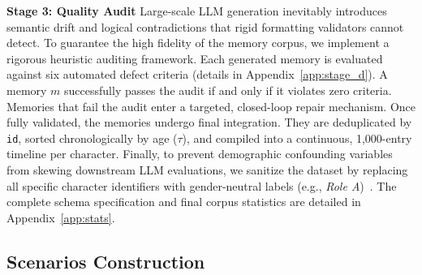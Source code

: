 \documentclass{article}
\begin{document}
\textbf{Stage 3: Quality Audit}
Large-scale LLM generation inevitably introduces semantic drift and logical contradictions that rigid formatting validators cannot detect. To guarantee the high fidelity of the memory corpus, we implement a rigorous heuristic auditing framework. Each generated memory is evaluated against six automated defect criteria (details in Appendix~\ref{app:stage_d}). A memory $m$ successfully passes the audit if and only if it violates zero criteria.
Memories that fail the audit enter a targeted, closed-loop repair mechanism. %
Once fully validated, the memories undergo final integration. They are deduplicated by \texttt{id}, sorted chronologically by age ($\tau$), and compiled into a continuous, 1,000-entry timeline per character. Finally, to prevent demographic confounding variables from skewing downstream LLM evaluations, we sanitize the dataset by replacing all specific character identifiers with gender-neutral labels (e.g., \textit{Role A})~\citep{sun2019mitigating}. The complete schema specification and final corpus statistics are detailed in Appendix~\ref{app:stats}.

\subsection{Scenarios Construction}
\label{sec:scenario}
\end{document}
